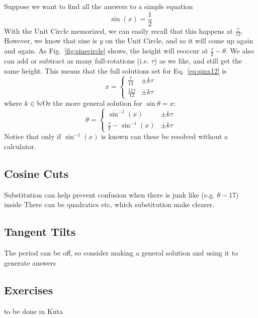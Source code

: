 Suppose we want to find all the answers to a simple equation
\begin{equation}\label{eq:sinx12}
\sin(x) = \frac{1}{2}
\end{equation}
With the Unit Circle memorized, we can easily recall that this happens at 
$\frac{\tau}{12}$.  However, we know that sine is $y$ on the Unit Circle, and so it
will come up again and again.  As Fig.~\ref{fig:sinecircle} shows, the height will
reoccur at $\frac{\tau}{2}-\theta$.  We also can add or subtract as many full-rotations
(i.e. $\tau$) as we like, and still get the same height.  This means that the full
solutions set for Eq.~\ref{eq:sinx12} is
$$
x  = \begin{cases} \frac{\tau}{12} & \pm k\tau\\
\frac{11\tau}{12} & \pm k\tau \end{cases} 
$$
where $k \in \mathbb{W}$Or the more general solution for $\sin\theta=x$:
\begin{equation}
\theta  = \begin{cases} \sin^{-1}(x) & \pm k\tau\\
\frac{\tau}{2} - \sin^{-1}(x) & \pm k\tau \end{cases} 
\end{equation}
Notice that only if $\sin^{-1}(x)$ is known can these be resolved without a
calculator.

\subsection{Cosine Cuts}
Substitution can help prevent confusion when there is junk like (e.g. $\theta-17$) inside
There can be quadratics etc, which substitution make clearer.
\subsection{Tangent Tilts}
The period can be off, so consider making a general solution and using it to generate answers
\newpage
\subsection{Exercises}
to be done in Kuta


